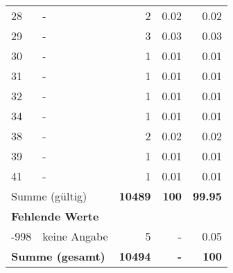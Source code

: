 \begin{longtable}{lXrrr}
        28 & \multicolumn{1}{X}{-} & %
          \num{2} &
          \num[round-mode=places,round-precision=2]{0.02} &
          \num[round-mode=places,round-precision=2]{0.02} \\

        29 & \multicolumn{1}{X}{-} & %
          \num{3} &
          \num[round-mode=places,round-precision=2]{0.03} &
          \num[round-mode=places,round-precision=2]{0.03} \\

        30 & \multicolumn{1}{X}{-} & %
          \num{1} &
          \num[round-mode=places,round-precision=2]{0.01} &
          \num[round-mode=places,round-precision=2]{0.01} \\

        31 & \multicolumn{1}{X}{-} & %
          \num{1} &
          \num[round-mode=places,round-precision=2]{0.01} &
          \num[round-mode=places,round-precision=2]{0.01} \\

        32 & \multicolumn{1}{X}{-} & %
          \num{1} &
          \num[round-mode=places,round-precision=2]{0.01} &
          \num[round-mode=places,round-precision=2]{0.01} \\

        34 & \multicolumn{1}{X}{-} & %
          \num{1} &
          \num[round-mode=places,round-precision=2]{0.01} &
          \num[round-mode=places,round-precision=2]{0.01} \\

        38 & \multicolumn{1}{X}{-} & %
          \num{2} &
          \num[round-mode=places,round-precision=2]{0.02} &
          \num[round-mode=places,round-precision=2]{0.02} \\

        39 & \multicolumn{1}{X}{-} & %
          \num{1} &
          \num[round-mode=places,round-precision=2]{0.01} &
          \num[round-mode=places,round-precision=2]{0.01} \\

        41 & \multicolumn{1}{X}{-} & %
          \num{1} &
          \num[round-mode=places,round-precision=2]{0.01} &
          \num[round-mode=places,round-precision=2]{0.01} \\

     \midrule
     \multicolumn{2}{l}{Summe (gültig)} &
       \textbf{\num{10489}} &
     \textbf{\num{100}} &
       \textbf{\num[round-mode=places,round-precision=2]{99.95}} \\
     \multicolumn{5}{l}{\textbf{Fehlende Werte}}\\
       -998 &
       keine Angabe &
         \num{5} &
        - &
         \num[round-mode=places,round-precision=2]{0.05} \\
     \midrule
     \multicolumn{2}{l}{\textbf{Summe (gesamt)}} &
          \textbf{\num{10494}} &
        \textbf{-} &
        \textbf{\num{100}} \\
     \bottomrule
     \end{longtable}
     
